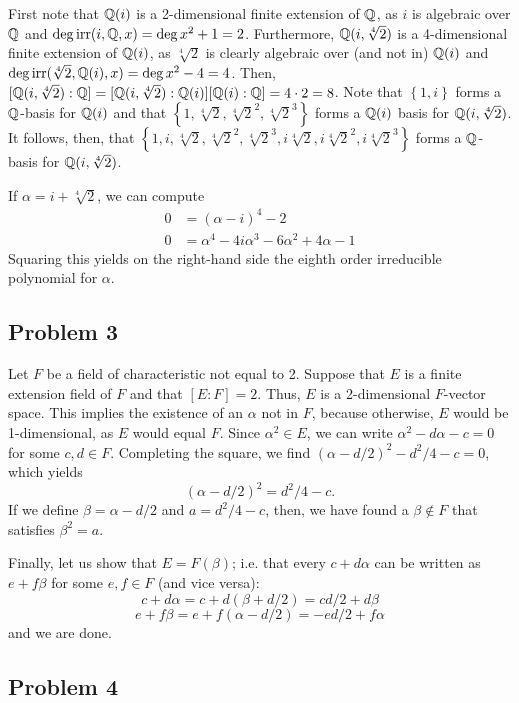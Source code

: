 \documentclass{../../mathnotes}
\begin{document}
First note that $\mathbb{Q}(i)$ is a 2-dimensional finite extension of $\mathbb{Q}$, as $i$ is algebraic over $\mathbb{Q}$ and $\deg\operatorname{irr}(i,\mathbb{Q},x)=\deg x^2+1=2$.
Furthermore, $\mathbb{Q}(i,\sqrt[4]{2})$ is a 4-dimensional finite extension of $\mathbb{Q}(i)$, as $\sqrt[4]{2}$ is clearly algebraic over (and not in) $\mathbb{Q}(i)$ and
$\deg\operatorname{irr}(\sqrt[4]{2},\mathbb{Q}(i),x)=\deg x^2-4=4$. Then, $[\mathbb{Q}(i,\sqrt[4]{2}):\mathbb{Q}]=[\mathbb{Q}(i,\sqrt[4]{2}):\mathbb{Q}(i)][\mathbb{Q}(i):\mathbb{Q}]=4\cdot2=8$.
Note that $\left\{ 1,i \right\}$ forms a $\mathbb{Q}$-basis for $\mathbb{Q}(i)$ and that $\left\{ 1,\sqrt[4]{2},\sqrt[4]{2}^2, \sqrt[4]{2}^3 \right\}$
forms a $\mathbb{Q}(i)$ basis for $\mathbb{Q}(i,\sqrt[4]{2})$. It follows, then, that $\left\{ 1,i, \sqrt[4]{2},\sqrt[4]{2}^2, \sqrt[4]{2}^3,
i\sqrt[4]{2},i\sqrt[4]{2}^2,i\sqrt[4]{2}^3\right\}$ forms a $\mathbb{Q}$-basis for $\mathbb{Q}(i,\sqrt[4]{2})$.

If $\alpha=i+\sqrt[4]{2}$, we can compute 
\begin{align*}
    0&=(\alpha-i)^4-2\\
    0&=\alpha^4-4i\alpha^3-6\alpha^2+4\alpha-1
\end{align*}
Squaring this yields on the right-hand side the eighth order irreducible polynomial for $\alpha$.


\subsection*{Problem 3}

Let $F$ be a field of characteristic not equal to 2. Suppose that $E$ is a finite extension field of $F$ and that $[E:F]=2$.
Thus, $E$ is a 2-dimensional $F$-vector space. This implies the existence of an $\alpha$ not in $F$, because otherwise, $E$ would
be 1-dimensional, as $E$ would equal $F$. Since $\alpha^2\in E$, we can write $\alpha^2-d\alpha-c=0$ for some $c,d\in F$.
Completing the square, we find $(\alpha-d/2)^2-d^2/4-c=0$, which yields
\[(\alpha-d/2)^2=d^2/4-c.\]
If we define $\beta=\alpha-d/2$ and $a=d^2/4-c$, then, we have found a $\beta\notin F$ that satisfies $\beta^2=a$.

Finally, let us show that $E=F(\beta)$; i.e. that every $c+d\alpha$ can be written as $e+f\beta$ for some $e,f\in F$
(and vice versa):
\[c+d\alpha=c+d(\beta+d/2)=cd/2+d\beta\]
\[e+f\beta=e+f(\alpha-d/2)=-ed/2+f\alpha\]
and we are done.

\subsection*{Problem 4}
\end{document}

